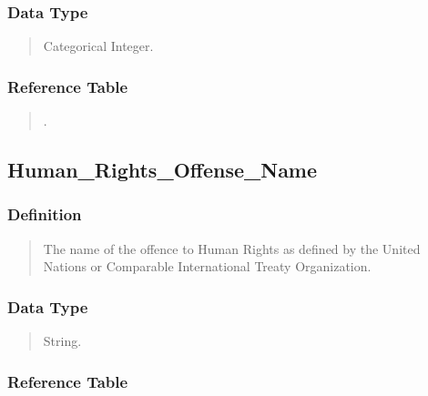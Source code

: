 \documentclass[letterpaper,10pt,english]{sphinxmanual}
\begin{document}
\subsubsection{Data Type}
\label{\detokenize{database_schema:id74}}\begin{quote}

\sphinxAtStartPar
Categorical Integer.
\end{quote}


\subsubsection{Reference Table}
\label{\detokenize{database_schema:id75}}\begin{quote}

\sphinxAtStartPar
{\hyperref[\detokenize{database_schema:human-rights-offense-table}]{}}.
\end{quote}


\subsection{Human\_Rights\_Offense\_Name}
\label{\detokenize{database_schema:human-rights-offense-name}}

\subsubsection{Definition}
\label{\detokenize{database_schema:id76}}\begin{quote}

\sphinxAtStartPar
The name of the offence to Human Rights as defined by the United Nations or Comparable International Treaty Organization.
\end{quote}


\subsubsection{Data Type}
\label{\detokenize{database_schema:id77}}\begin{quote}

\sphinxAtStartPar
String.
\end{quote}


\subsubsection{Reference Table}
\label{\detokenize{database_schema:id78}}\begin{quote}

\sphinxAtStartPar
{\hyperref[\detokenize{database_schema:human-rights-offense-table}]{}}
\end{quote}
\end{document}
